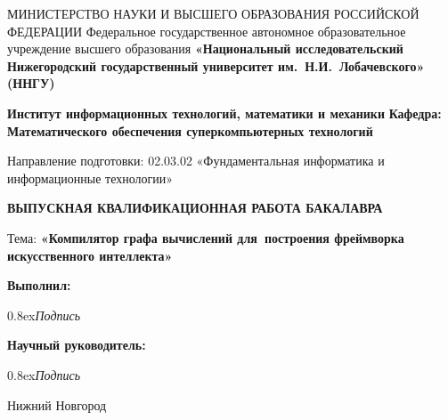 {
\begin{titlepage}
  \begin{center}
    МИНИСТЕРСТВО НАУКИ И ВЫСШЕГО ОБРАЗОВАНИЯ РОССИЙСКОЙ ФЕДЕРАЦИИ\break
    Федеральное государственное автономное образовательное учреждение высшего образования\break
    \textbf{«Национальный исследовательский Нижегородский государственный университет им.~Н.И.~Лобачевского» (ННГУ)}
    \break

    \vspace*{1.25cm}

    \textbf{Институт информационных технологий, математики и механики}\break
    \textbf{Кафедра: Математического обеспечения суперкомпьютерных технологий}
    \vspace{0.5cm}

    Направление подготовки: 02.03.02 «Фундаментальная информатика и информационные технологии»\break

    \vspace{2.5cm}

    \large{\textbf{ВЫПУСКНАЯ КВАЛИФИКАЦИОННАЯ РАБОТА БАКАЛАВРА }}\break

    \vspace{0.25cm}

    Тема:\break
    \large{\textbf{«Компилятор графа вычислений для~построения фреймворка искусственного интеллекта»}}
  \end{center}

\vspace{2cm}

\hfill\textbf{Выполнил:} 

 \hfill \makebox[2cm]{\hrulefill} 

 \hfill  {\raise0.8ex\hbox{\footnotesize \textit{Подпись}}} \makebox[5.65cm]{\hfill}

 \hfill\textbf{Научный руководитель:} 

 \hfill \makebox[2cm]{\hrulefill} 

 \hfill  {\raise0.8ex\hbox{\footnotesize \textit{Подпись}}} \makebox[5.55cm]{\hfill}

\vfill
\begin{center}
  Нижний Новгород
\end{center}
\end{titlepage}
}
